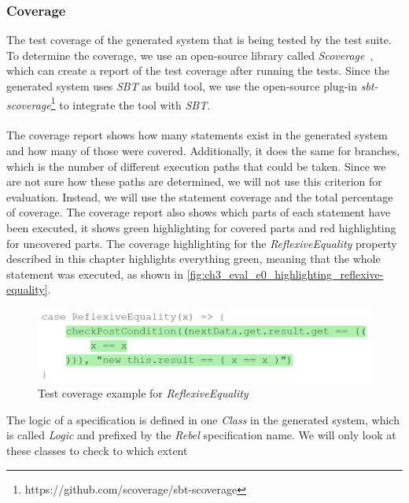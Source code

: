 \subsubsection{Coverage}
The test coverage of the generated system that is being tested by the test
suite. To determine the coverage, we use an open-source library called
\textit{Scoverage}~\cite{siteScoverage2017}, which can create a report of the
test coverage after running the tests. Since the generated system uses
\textit{SBT} as build tool, we use the open-source plug-in
\textit{sbt-scoverage}\footnote{https://github.com/scoverage/sbt-scoverage} to
integrate the tool with \textit{SBT}.\\
\\
The coverage report shows how many statements exist in the generated system and
how many of those were covered. Additionally, it does the same for branches,
which is the number of different execution paths that could be taken. Since we
are not sure how these paths are determined, we will not use this criterion for
evaluation. Instead, we will use the statement coverage and the total percentage
of coverage. The coverage report also shows which parts of each statement have
been executed, it shows green highlighting for covered parts and red
highlighting for uncovered parts. The coverage highlighting for the
\textit{ReflexiveEquality} property described in this chapter highlights
everything green, meaning that the whole statement was executed, as shown in
\autoref{fig:ch3_eval_e0_highlighting_reflexive-equality}.
\begin{figure}[!ht]
	\includegraphics[width=\linewidth]{figures/e0_coverage_property_sample}
\caption{Test coverage example for \textit{ReflexiveEquality}}
\label{fig:ch3_eval_e0_highlighting_reflexive-equality}
\centering
\end{figure}
\FloatBarrier
The logic of a specification is defined in one \textit{Class} in the generated
system, which is called \textit{Logic} and prefixed by the \textit{Rebel}
specification name. We will only look at these classes to check to which extent
